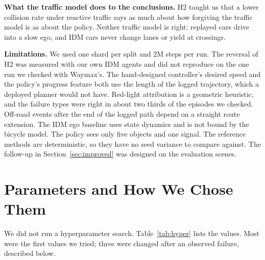 \documentclass[conference]{IEEEtran}
\begin{document}
\textbf{What the traffic model does to the conclusions.} H2 taught us that a lower
collision rate under reactive traffic says as much about how forgiving the traffic
model is as about the policy. Neither traffic model is right: replayed cars drive into a
slow ego, and IDM cars never change lanes or yield at crossings.

\textbf{Limitations.} We used one shard per split and 2M steps per run. The reversal of H2 was measured with our own IDM agents and did not reproduce on the one run we checked with Waymax's. The hand-designed
controller's desired speed and the policy's progress feature both use the length of the
logged trajectory, which a deployed planner would not have. Red-light attribution is a
geometric heuristic, and the failure types were right in about two thirds of the
episodes we checked. Off-road events after the end of the logged path depend on a
straight route extension. The IDM ego baseline uses state dynamics and is not bound by the
bicycle model. The policy sees only five objects and one signal. The reference methods
are deterministic, so they have no seed variance to compare against. The follow-up in
Section~\ref{sec:improved} was designed on the evaluation scenes.

\section{Parameters and How We Chose Them}\label{sec:hyper}

We did not run a hyperparameter search. Table~\ref{tab:hyper} lists the values. Most
were the first values we tried; three were changed after an observed failure, described
below.
\end{document}
